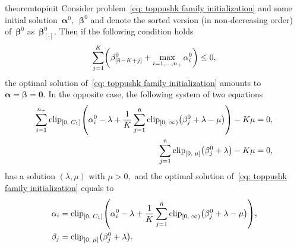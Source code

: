 \begin{restatable}{theorem}{topinit}\label{thm:problem3}
  Consider problem~\eqref{eq: toppushk family initialization} and some initial solution~$\bm{\alpha}^0,$~$\bm{\beta}^0$ and denote the sorted version (in non-decreasing order) of~$\bm{\beta}^0$ as~$\bm{\beta}_{[\cdot]}^0.$ Then if the following condition holds
  \begin{equation}\label{eq:problem3_cond}
    \sum_{j = 1}^{K} \Brac{\beta_{[\ntil - K + j]}^0 + \max_{i = 1, \ldots, \npos} \alpha_i^0} \le 0,
  \end{equation}
  the optimal solution of~\eqref{eq: toppushk family initialization} amounts to~$\bm{\alpha} = \bm{\beta} = \bm{0}.$ In the opposite case, the following system of two equations
  \begin{subequations}\label{eq:problem3_system}
    \begin{align}
      \sum_{i=1}^{\npos} \clip{0}{C_1}{ \alpha_i^0 - \lambda + \frac{1}{K} \sum_{j=1}^{\ntil} \clip[u]{0}{\infty}{\beta_j^0 + \lambda - \mu}} - K \mu
      & = 0, \label{eq:problem3_system1} \\
      \sum_{j=1}^{\ntil} \clip{0}{\mu}{\beta_j^0 + \lambda} - K\mu
      & = 0, \label{eq:problem3_system2}
    \end{align}
  \end{subequations}
  has a solution $(\lambda, \mu)$ with $\mu > 0,$ and the optimal solution of~\eqref{eq: toppushk family initialization} equals to
  \begin{align*}
    \alpha_i
      & = \clip{0}{C_1}{\alpha_i^0 - \lambda + \frac{1}{K} \sum_{j=1}^{\ntil} \clip[u]{0}{\infty}{\beta_j^0 + \lambda - \mu}}, \\
    \beta_j & = \clip{0}{\mu}{\beta_j^0 + \lambda}.
  \end{align*}
\end{restatable}

